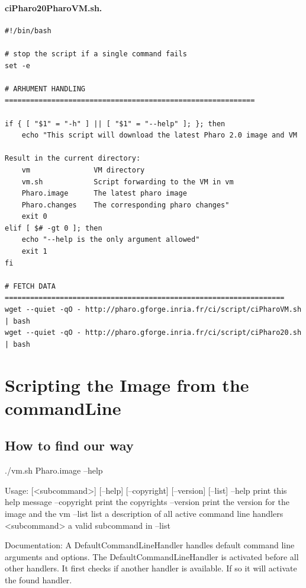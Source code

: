 \documentclass[a4paper,10pt,twoside]{book}
\begin{document}
\paragraph{ciPharo20PharoVM.sh.}

\begin{scriptsize}
\begin{verbatim}
#!/bin/bash

# stop the script if a single command fails
set -e 

# ARHUMENT HANDLING ===========================================================

if { [ "$1" = "-h" ] || [ "$1" = "--help" ]; }; then
    echo "This script will download the latest Pharo 2.0 image and VM

Result in the current directory:
    vm               VM directory
    vm.sh            Script forwarding to the VM in vm
    Pharo.image      The latest pharo image
    Pharo.changes    The corresponding pharo changes"
    exit 0
elif [ $# -gt 0 ]; then
    echo "--help is the only argument allowed"
    exit 1
fi

# FETCH DATA ==================================================================
wget --quiet -qO - http://pharo.gforge.inria.fr/ci/script/ciPharoVM.sh | bash
wget --quiet -qO - http://pharo.gforge.inria.fr/ci/script/ciPharo20.sh | bash
\end{verbatim}
\end{scriptsize}

\section{Scripting the Image from the commandLine}


\subsection{How to find our way}

\begin{code}{}
./vm.sh Pharo.image --help
\end{code}

\begin{code}{}
Usage: [<subcommand>] [--help] [--copyright] [--version] [--list]
	--help       print this help message
	--copyright  print the copyrights
	--version    print the version for the image and the vm
	--list       list a description of all active command line handlers
	<subcommand> a valid subcommand in --list
	
Documentation:
A DefaultCommandLineHandler handles default command line arguments and options.
The DefaultCommandLineHandler is activated before all other handlers. 
It first checks if another handler is available. If so it will activate the found handler.
\end{code}
\end{document}
